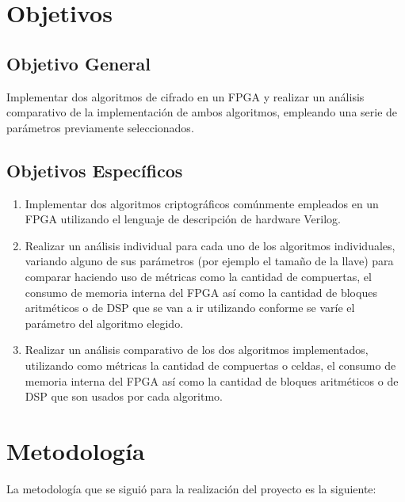 \section{Objetivos}

\subsection{Objetivo General}

Implementar dos algoritmos de cifrado en un FPGA y realizar un análisis comparativo de la implementación de ambos algoritmos, empleando una serie de parámetros previamente seleccionados.


\subsection{Objetivos Específicos}

\begin{enumerate}

\item Implementar dos algoritmos criptográficos comúnmente empleados en un FPGA utilizando el lenguaje de descripción de hardware Verilog.

\item Realizar un análisis individual para cada uno de los algoritmos individuales, variando alguno de sus parámetros (por ejemplo el tamaño de la llave) para comparar haciendo uso de métricas como la cantidad de compuertas, el consumo de memoria interna del FPGA así como la cantidad de bloques aritméticos o de DSP que se van a ir utilizando conforme se varíe el parámetro del algoritmo elegido.

\item Realizar un análisis comparativo de los dos algoritmos implementados, utilizando como métricas la cantidad de compuertas o celdas, el consumo de memoria interna del FPGA así como la cantidad de bloques aritméticos o de DSP que son usados por cada algoritmo.


\end{enumerate}

\section{Metodología}

La metodología que se siguió para la realización del proyecto es la siguiente:


